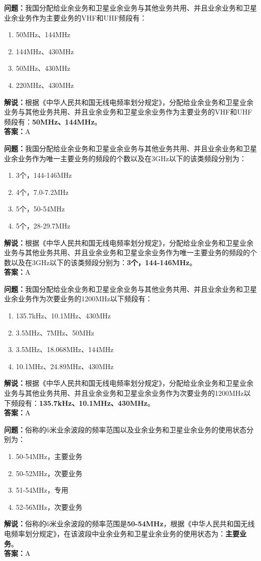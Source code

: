 \textbf{问题：}我国分配给业余业务和卫星业余业务与其他业务共用、并且业余业务和卫星业余业务作为主要业务的VHF和UHF频段有：
\begin{enumerate}[label=\Alph*), leftmargin=1cm]
  \item 50MHz、144MHz
  \item 144MHz、430MHz
  \item 50MHz、430MHz
  \item 220MHz、430MHz
\end{enumerate}
\textbf{解说：}根据《中华人民共和国无线电频率划分规定》，分配给业余业务和卫星业余业务与其他业务共用、并且业余业务和卫星业余业务作为主要业务的VHF和UHF频段有：\textbf{50MHz、144MHz}。\\\textbf{答案：}A%

\textbf{问题：}我国分配给业余业务和卫星业余业务与其他业务共用、并且业余业务和卫星业余业务作为唯一主要业务的频段的个数以及在3GHz以下的该类频段分别为：
\begin{enumerate}[label=\Alph*), leftmargin=1cm]
  \item 3个，144-146MHz
  \item 4个，7.0-7.2MHz
  \item 5个，50-54MHz
  \item 5个，28-29.7MHz
\end{enumerate}
\textbf{解说：}根据《中华人民共和国无线电频率划分规定》，分配给业余业务和卫星业余业务与其他业务共用、并且业余业务和卫星业余业务作为唯一主要业务的频段的个数以及在3GHz以下的该类频段分别为：\textbf{3个，144-146MHz}。\\\textbf{答案：}A%

\textbf{问题：}我国分配给业余业务和卫星业余业务与其他业务共用、并且业余业务和卫星业余业务作为次要业务的1200MHz以下频段有：
\begin{enumerate}[label=\Alph*), leftmargin=1cm]
  \item 135.7kHz、10.1MHz、430MHz
  \item 3.5MHz、7MHz、50MHz
  \item 3.5MHz、18.068MHz、144MHz
  \item 10.1MHz、24.89MHz、430MHz
\end{enumerate}
\textbf{解说：}根据《中华人民共和国无线电频率划分规定》，分配给业余业务和卫星业余业务与其他业务共用、并且业余业务和卫星业余业务作为次要业务的1200MHz以下频段有：\textbf{135.7kHz、10.1MHz、430MHz}。\\\textbf{答案：}A%

\textbf{问题：}俗称的6米业余波段的频率范围以及业余业务和卫星业余业务的使用状态分别为：
\begin{enumerate}[label=\Alph*), leftmargin=1cm]
  \item 50-54MHz，主要业务
  \item 50-52MHz，次要业务
  \item 51-54MHz，专用
  \item 52-56MHz，次要业务
\end{enumerate}
\textbf{解说：}俗称的6米业余波段的频率范围是\textbf{50-54MHz}，根据《中华人民共和国无线电频率划分规定》，在该波段中业余业务和卫星业余业务的使用状态为：\textbf{主要业务}。\\\textbf{答案：}A

